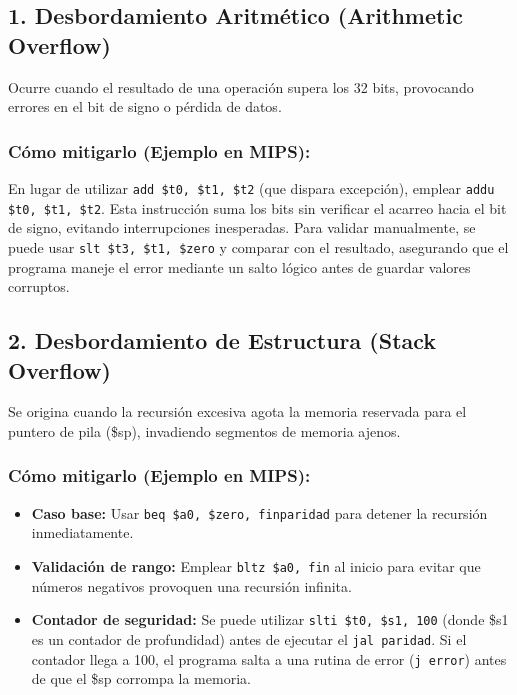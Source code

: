 \documentclass[12pt]{article}
\begin{document}
\subsection*{1. Desbordamiento Aritmético (Arithmetic Overflow)}

Ocurre cuando el resultado de una operación supera los 32 bits, provocando errores en el bit de signo o pérdida de datos.

\subsubsection*{Cómo mitigarlo (Ejemplo en MIPS):}

En lugar de utilizar \texttt{add \$t0, \$t1, \$t2} (que dispara excepción), emplear \texttt{addu \$t0, \$t1, \$t2}. Esta instrucción suma los bits sin verificar el acarreo hacia el bit de signo, evitando interrupciones inesperadas. Para validar manualmente, se puede usar \texttt{slt \$t3, \$t1, \$zero} y comparar con el resultado, asegurando que el programa maneje el error mediante un salto lógico antes de guardar valores corruptos.

\subsection*{2. Desbordamiento de Estructura (Stack Overflow)}

Se origina cuando la recursión excesiva agota la memoria reservada para el puntero de pila (\$sp), invadiendo segmentos de memoria ajenos.

\subsubsection*{Cómo mitigarlo (Ejemplo en MIPS):}

\begin{itemize}
    \item \textbf{Caso base:} Usar \texttt{beq \$a0, \$zero, finparidad} para detener la recursión inmediatamente.
    \item \textbf{Validación de rango:} Emplear \texttt{bltz \$a0, fin} al inicio para evitar que números negativos provoquen una recursión infinita.
    \item \textbf{Contador de seguridad:} Se puede utilizar \texttt{slti \$t0, \$s1, 100} (donde \$s1 es un contador de profundidad) antes de ejecutar el \texttt{jal paridad}. Si el contador llega a 100, el programa salta a una rutina de error (\texttt{j error}) antes de que el \$sp corrompa la memoria.
\end{itemize}
\end{document}
